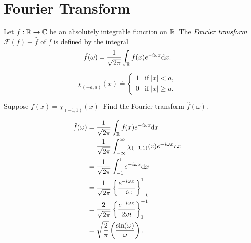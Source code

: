 
\section{Fourier Transform} %
\label{sec:fourier}

\begin{defn}
	Let $f: \mathbb{R} \to \mathbb{C}$ be an absolutely integrable function
	on $\mathbb{R}$. The $\emph{Fourier transform}$
	$\mathcal{F}(f) \equiv \hat{f}$ of $f$ is defined by the
	integral
	\[
		\hat{f}(\omega) = \frac{1}{\sqrt{2 \pi}}
		\int_{\mathbb{R}} f(x) e^{-i \omega x} \mathrm{d}x .
	\]
\end{defn}

\begin{defn}
	\[
		\chi_{(-a,a)}(x) \doteq
		\begin{cases}
			1 & \text{if } |x| < a,\\
			0 & \text{if } |x| \geq a.
		\end{cases}
	\]
\end{defn}

\begin{exmp}
	Suppose $f(x) = \chi_{(-1,1)}(x)$. Find the Fourier
	transform $\hat{f}(\omega)$.

	\begin{align*}
		\hat{f}(\omega) &=
		\frac{1}{\sqrt{2 \pi}} \int_{\mathbb{R}} f(x) e^{-i \omega x} \mathrm{d}x
		\\
		&= \frac{1}{\sqrt{2 \pi}} \int_{-\infty}^{\infty} 
		\chi_{(-1,1)}(x) e^{-i \omega x} \mathrm{d}x
		\\
		&= \frac{1}{\sqrt{2 \pi}} \int_{-1}^{1} e^{-i \omega x} \mathrm{d}x
		\\
		&= \frac{1}{\sqrt{2 \pi}}
		\left\{ \frac{e^{-i \omega x}}{- i \omega} \right\}_{-1}^{1}
		\\
		&= \frac{2}{\sqrt{2 \pi}}
		\left\{ \frac{e^{-i \omega x}}{2 \omega i} \right\}_{1}^{-1}
		\\
		&= \sqrt{\frac{2}{\pi}} \left( \frac{\sin(\omega)}{\omega} \right).
	\end{align*}

\end{exmp}
